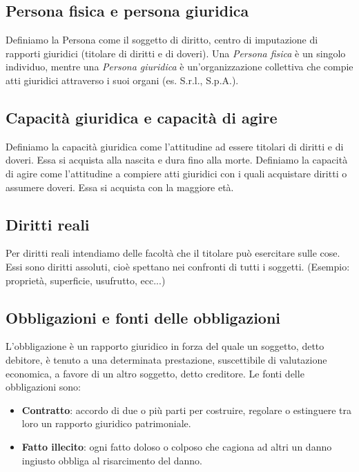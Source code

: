 \subsection{Persona fisica e persona giuridica}
Definiamo la Persona come il soggetto di diritto, centro di imputazione di rapporti giuridici (titolare di diritti e di doveri).\newline
Una \emph{Persona fisica} è un singolo individuo, mentre una \emph{Persona giuridica} è un'organizzazione collettiva che compie atti giuridici
attraverso i suoi organi (es. S.r.l., S.p.A.).

\subsection{Capacità giuridica e capacità di agire}
Definiamo la capacità giuridica come l'attitudine ad essere titolari di diritti e di doveri. Essa si acquista alla nascita e dura fino alla morte.\newline
Definiamo la capacità di agire come l'attitudine a compiere atti giuridici con i quali acquistare diritti o assumere doveri. Essa si acquista con la maggiore età.

\subsection{Diritti reali}
Per diritti reali intendiamo delle facoltà che il titolare può esercitare sulle cose. Essi sono diritti assoluti, cioè spettano nei confronti di tutti i
soggetti. (Esempio: proprietà, superficie, usufrutto, ecc...)

\subsection{Obbligazioni e fonti delle obbligazioni}
L'obbligazione è un rapporto giuridico in forza del quale un soggetto, detto debitore, è tenuto a una determinata prestazione, suscettibile 
di valutazione economica, a favore di un altro soggetto, detto creditore.
Le fonti delle obbligazioni sono:
\begin{itemize}
    \item \textbf{Contratto}: accordo di due o più parti per costruire, regolare o estinguere tra loro un rapporto giuridico patrimoniale.
    \item \textbf{Fatto illecito}: ogni fatto doloso o colposo che cagiona ad altri un danno ingiusto obbliga al risarcimento del danno.
\end{itemize}

